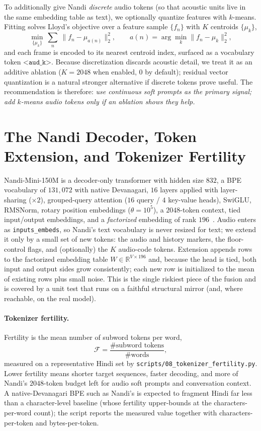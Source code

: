 \documentclass[11pt]{article}
\newcommand{\code}[1]{\texttt{#1}}
\newcommand{\flag}[1]{\texttt{<#1>}}
\begin{document}
To additionally give Nandi \emph{discrete} audio tokens (so that acoustic units live in the
same embedding table as text), we optionally quantize features with $k$-means. Fitting
solves Lloyd's objective over a feature sample $\{f_n\}$ with $K$ centroids $\{\mu_k\}$,
\begin{equation}
\min_{\{\mu_k\}}\ \sum_{n}\ \big\lVert f_n-\mu_{a(n)}\big\rVert_2^2,\qquad a(n)=\arg\min_k \lVert f_n-\mu_k\rVert_2^2,
\end{equation}
and each frame is encoded to its nearest centroid index, surfaced as a vocabulary token
$\flag{aud\_k}$. Because discretization discards acoustic detail, we treat it as an additive
ablation ($K{=}2048$ when enabled, $0$ by default); residual vector quantization is a natural
stronger alternative if discrete tokens prove useful. The recommendation is therefore:
\emph{use continuous soft prompts as the primary signal; add $k$-means audio tokens only if
an ablation shows they help.}

\section{The Nandi Decoder, Token Extension, and Tokenizer Fertility}
Nandi-Mini-150M is a decoder-only transformer with hidden size $832$, a BPE vocabulary of
$131{,}072$ with native Devanagari, $16$ layers applied with layer-sharing ($\times 2$),
grouped-query attention ($16$ query / $4$ key-value heads), SwiGLU, RMSNorm, rotary position
embeddings ($\theta{=}10^5$), a $2048$-token context, tied input/output embeddings, and a
\emph{factorized} embedding of rank $196$~\cite{nandi}. Audio enters as \code{inputs\_embeds},
so Nandi's text vocabulary is never resized for text; we extend it only by a small set of
new tokens: the audio and history markers, the floor-control flags, and (optionally) the
$K$ audio-code tokens. Extension appends rows to the factorized embedding table
$W\in\mathbb{R}^{V\times 196}$ and, because the head is tied, both input and output sides
grow consistently; each new row is initialized to the mean of existing rows plus small
noise. This is the single riskiest piece of the fusion and is covered by a unit test that
runs on a faithful structural mirror (and, where reachable, on the real model).

\paragraph{Tokenizer fertility.} Fertility is the mean number of subword tokens per word,
\begin{equation}
\mathcal{F}=\frac{\#\text{subword tokens}}{\#\text{words}},
\end{equation}
measured on a representative Hindi set by \code{scripts/08\_tokenizer\_fertility.py}. Lower
fertility means shorter target sequences, faster decoding, and more of Nandi's $2048$-token
budget left for audio soft prompts and conversation context. A native-Devanagari BPE such as
Nandi's is expected to fragment Hindi far less than a character-level baseline (whose
fertility upper-bounds at the characters-per-word count); the script reports the measured
value together with characters-per-token and bytes-per-token.
\end{document}
